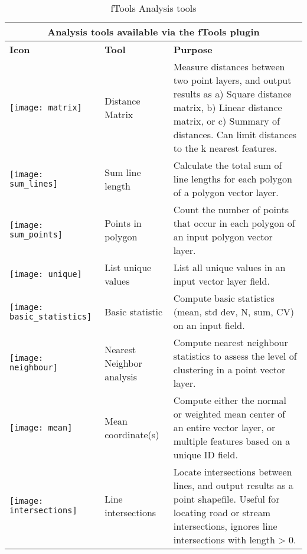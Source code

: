 \begin{table}[ht]
\centering
 \begin{tabular}{|m{1cm}|m{3cm}|m{9cm}|}
\hline \multicolumn{3}{|c|}{\textbf{Analysis tools available via the fTools plugin}} \\
 \hline \textbf{Icon} & \textbf{Tool} & \textbf{Purpose} \\
 \hline \texttt{[image: matrix]} & Distance Matrix &
Measure distances between two point layers, and output results as a) Square
distance matrix, b) Linear distance matrix, or c) Summary of distances. Can
limit distances to the k nearest features. \\ 
 \hline \texttt{[image: sum\_lines]} & Sum line length & Calculate
the total sum of line lengths for each polygon of a polygon vector layer. \\
 \hline \texttt{[image: sum\_points]} & Points in polygon & Count
the number of points that occur in each polygon of an input polygon vector
layer. \\
 \hline \texttt{[image: unique]} & List unique values & List
all unique values in an input vector layer field. \\
 \hline \texttt{[image: basic\_statistics]} & Basic statistic & Compute
basic statistics (mean, std dev, N, sum, CV) on an input field. \\ 
 \hline \texttt{[image: neighbour]} & Nearest Neighbor analysis
& Compute nearest neighbour statistics to assess the level of clustering in a
point vector layer. \\
 \hline \texttt{[image: mean]} & Mean coordinate(s) &
Compute either the normal or weighted mean center of an entire vector layer,
or multiple features based on a unique ID field. \\ 
 \hline \texttt{[image: intersections]} & Line intersections &
Locate intersections between lines, and output results as a point shapefile.
Useful for locating road or stream intersections, ignores line intersections
with length > 0. \\
 \hline
\end{tabular}
\caption{fTools Analysis tools}\label{tab:ftool_analysis}
\end{table}

